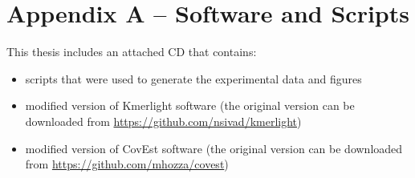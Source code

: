 \chapter*{Appendix A -- Software and Scripts}

This thesis includes an attached CD that contains:
\begin{itemize}
\item scripts that were used to generate the experimental data and figures
\item modified version of Kmerlight software (the original version can be downloaded from 
\url{https://github.com/nsivad/kmerlight})
\item modified version of CovEst software (the original version can be downloaded from 
\url{https://github.com/mhozza/covest})
\end{itemize}